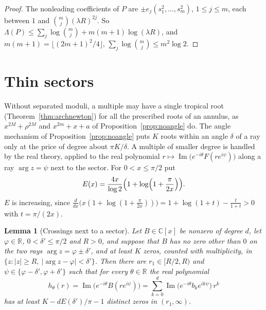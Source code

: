 \documentclass[11pt]{article}
\newtheorem{lemma}[theorem]{Lemma}
\newcommand{\R}{\mathbb R}
\begin{document}
\begin{proof}
The nonleading coefficients of $P$ are $\pm e_j(s_1^2,\ldots,s_m^2)$,
$1\le j\le m$, each between $1$ and $\binom mj(\lambda R)^{2j}$.  So
$\Lambda(P)\le\sum_j\log\binom mj+m(m+1)\log(\lambda R)$, and
$m(m+1)=\lfloor(2m+1)^2/4\rfloor$, $\sum_j\log\binom mj\le m^2\log2$.
\end{proof}


\section{Thin sectors}\label{sec:thin}

Without separated moduli, a multiple may have a single tropical root
(Theorem~\ref{thm:archnewton}) for all the prescribed roots of an annulus, as $x^{2M}+\rho^{2M}$ and
$x^{2m}+x+a$ of Proposition~\ref{prop:noangle} do.  The angle mechanism of
Proposition~\ref{prop:noangle} puts $K$ roots within an angle $\delta$ of a
ray only at the price of degree about $\pi K/\delta$.  A multiple of smaller
degree is handled by the real theory, applied to the real polynomial
$r\mapsto\operatorname{Im}\bigl(e^{-i\theta}F(re^{i\psi})\bigr)$ along a ray
$\arg z=\psi$ next to the sector.  For $0<x\le\pi/2$ put
\[
  E(x)=\frac{4x}{\log2}\Bigl(1+\log\Bigl(1+\frac{\pi}{2x}\Bigr)\Bigr).
\]
$E$ is increasing, since
$\frac{d}{dx}\bigl(x(1+\log(1+\frac{\pi}{2x}))\bigr)=1+\log(1+t)-\frac t{1+t}>0$
with $t=\pi/(2x)$.

\begin{lemma}[Crossings next to a sector]\label{lem:sectorcount}
Let $B\in\mathbb C[x]$ be nonzero of degree $d$, let $\varphi\in\R$,
$0<\delta'\le\pi/2$ and $R>0$, and suppose that $B$ has no zero other than $0$
on the two rays $\arg z=\varphi\pm\delta'$, and at least $K$ zeros, counted
with multiplicity, in $\{z:|z|\ge R,\ |\arg z-\varphi|<\delta'\}$.  Then there are
$r_1\in[R/2,R)$ and $\psi\in\{\varphi-\delta',\varphi+\delta'\}$ such that for
every $\theta\in\R$ the real polynomial
\[
  h_\theta(r)=\operatorname{Im}\bigl(e^{-i\theta}B(re^{i\psi})\bigr)
  =\sum_{k=0}^d\operatorname{Im}\bigl(e^{-i\theta}b_ke^{ik\psi}\bigr)\,r^k
\]
has at least $K-dE(\delta')/\pi-1$ distinct zeros in $(r_1,\infty)$.
\end{lemma}
\end{document}

